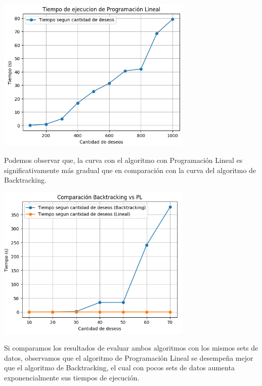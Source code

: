 \documentclass{estilo}
\begin{document}
\newpage
\begin{center}
\includegraphics[width=0.7\textwidth]{img/tiempo_pl.png}

Podemos observar que, la curva con el algoritmo con Programación Lineal es significativamente más gradual que en comparación con la curva del algoritmo de Backtracking.
\end{center}

\begin{center}
\includegraphics[width=0.7\textwidth]{img/backtracking_vs_pl.png}

Si comparamos los resultados de evaluar ambos algoritmos con los mismos sets de datos, observamos que el algoritmo de Programación Lineal se desempeña mejor que el algoritmo de Backtracking, el cual con pocos sets de datos aumenta exponencialmente sus tiempos de ejecución.
\end{center}
\end{document}
